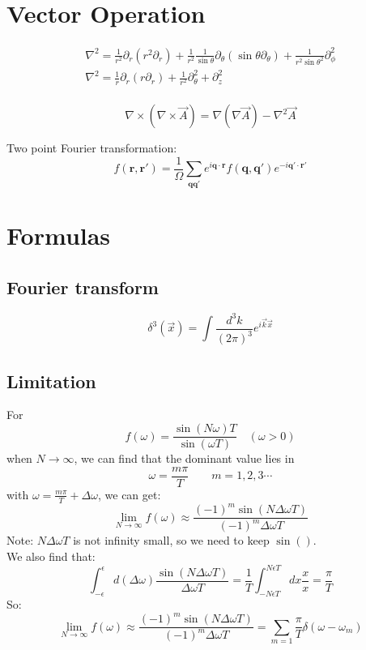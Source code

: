\section{Vector Operation}
\begin{gather*}
    \nabla^2 = \frac{1}{r^2}\partial_r(r^2 \partial_r) 
      + \frac{1}{r^2}\frac{1}{\sin\theta} \partial_{\theta}(\sin\theta\partial_{\theta}) 
      + \frac{1}{r^2\sin\theta^2}\partial^2_{\phi}	\\ 
    \nabla^2 = \frac{1}{r}\partial_r (r\partial_r) 
      + \frac{1}{r^2}\partial^2_{\theta} + \partial^2_z \\
\end{gather*}

\begin{equation}
    \nabla\times(\nabla\times\vec{A}) = \nabla(\nabla\vec{A}) - \nabla^2\vec{A} 
\end{equation}

Two point Fourier transformation:
\begin{equation}
    \displaystyle f(\bm{r,r'}) = \frac{1}{\Omega}\sum_{\bm{qq'}}e^{i\bm{q\cdot r}}f(\bm{q,q'})e^{-i\bm{q'\cdot r'}}
\end{equation}

\section{Formulas}

\subsection{Fourier transform}
\[
    \delta^3(\vec{x})=\int\frac{d^3k}{(2\pi)^3}e^{i\vec{k}\vec{x}}
    \]
\subsection{Limitation}
For 
\[
    f(\omega) = \frac{\sin(N\omega)T}{\sin(\omega T)}   \quad (\omega > 0)
    \]
when $N\rightarrow\infty$, 
we can find that the dominant value lies in 
\[
    \omega = \frac{m\pi}{T} \qquad  m=1,2,3 \cdots
    \]
with $\omega=\frac{m\pi}{T}+\Delta\omega$, we can get:
\begin{equation}
    \displaystyle \lim_{N\rightarrow\infty}f(\omega)\approx\frac{(-1)^m\sin(N\Delta\omega T)}{(-1)^m\Delta\omega T}
\end{equation}
Note: $N\Delta\omega T$ is not infinity small, so we need to keep $\sin()$. \\
We also find that:
\begin{equation}
    \int_{-\epsilon}^{\epsilon}d(\Delta\omega)\frac{\sin(N\Delta\omega T)}{\Delta\omega T}
    =\frac{1}{T}\int_{-N\epsilon T}^{N\epsilon T} dx\frac{x}{x} = \frac{\pi}{T}
\end{equation}
So: 
\begin{equation}
    \displaystyle \lim_{N\rightarrow\infty}f(\omega)\approx\frac{(-1)^m\sin(N\Delta\omega T)}{(-1)^m\Delta\omega T}
    =\displaystyle \sum_{m=1}\frac{\pi}{T}\delta({\omega-\omega_m})
\end{equation}


